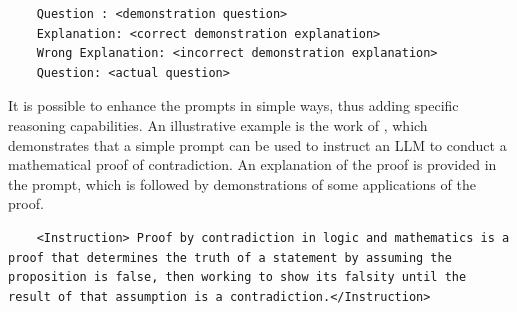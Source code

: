 \documentclass{article}
\begin{document}
\begin{verbatim}
	Question : <demonstration question>
	Explanation: <correct demonstration explanation>
	Wrong Explanation: <incorrect demonstration explanation>
	Question: <actual question>
\end{verbatim}

It is possible to enhance the prompts in simple ways, thus adding specific reasoning capabilities. An illustrative example is the work of \cite{zhang_large_2024}, which demonstrates that a simple prompt can be used to instruct an LLM to conduct a mathematical proof of contradiction. 
An explanation of the proof is provided in the prompt, which is followed by demonstrations of some applications of the proof.
\begin{verbatim}
	<Instruction> Proof by contradiction in logic and mathematics is a proof that determines the truth of a statement by assuming the proposition is false, then working to show its falsity until the result of that assumption is a contradiction.</Instruction>
\end{verbatim}
\end{document}
